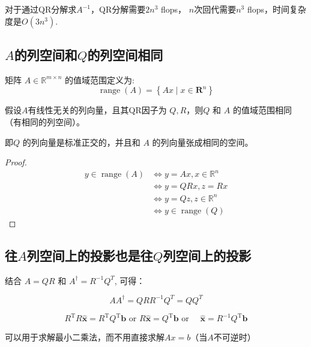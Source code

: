 对于通过QR分解求$A^{-1}$，QR分解需要$2n^3$ flops， $n$次回代需要$n^3$ flops，时间复杂度是$O(3n^3)$.

\subsection{$A$的列空间和$Q$的列空间相同}

矩阵 $A \in \mathbb{R}^{m \times n}$ 的值域范围定义为:
$$
\operatorname{range}(A)=\left\{A x \mid x \in \mathbf{R}^{n}\right\}
$$

\begin{theorem}
    假设$A$有线性无关的列向量，且其QR因子为 $Q, R$，则$Q$ 和 $A$ 的值域范围相同（有相同的列空间）。

\end{theorem}

即$Q$ 的列向量是标准正交的，并且和 $A$ 的列向量张成相同的空间。

\begin{proof}
    $$
\begin{aligned}
y \in \operatorname{range}(A) & \Leftrightarrow  y=A x, x \in \mathbb{R}^{n} \\
& \Leftrightarrow  y=Q R x, z=R x \\
& \Leftrightarrow  y=Q z, z \in \mathbb{R}^{n} \\
& \Leftrightarrow  y \in \operatorname{range}(Q)
\end{aligned}
$$
\end{proof}

\subsection{往$A$列空间上的投影也是往$Q$列空间上的投影}

结合 $A=Q R$ 和 $A^{\dagger}=R^{-1} Q^{T}$, 可得：

\begin{theorem}
    $$
A A^{\dagger}=Q R R^{-1} Q^{T}=Q Q^{T}
$$
\end{theorem}

\begin{theorem}
    $$
R^{\mathrm{T}} R \widehat{\boldsymbol{x}}=R^{\mathrm{T}} Q^{\mathrm{T}} \boldsymbol{b} \text { or } R \widehat{\boldsymbol{x}}=Q^{\mathrm{T}} \boldsymbol{b} \text { or } \quad \widehat{\boldsymbol{x}}=R^{-1} Q^{\mathrm{T}} \boldsymbol{b}
$$

可以用于求解最小二乘法，而不用直接求解$Ax=b$（当$A$不可逆时）
\end{theorem}

